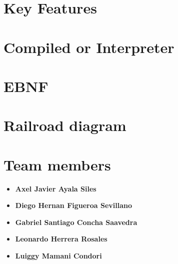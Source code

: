 \documentclass{article}
\begin{document}
\section{Key Features}
\label{sec:key-features}

\section{Compiled or Interpreter}
\label{sec:compiled-or-interpreter}

\section{EBNF}
\label{sec:bnf}

\section{Railroad diagram}
\label{sec:grail-road}

\section{Team members}
\label{sec:members}
\begin{itemize}
    \item \textbf{Axel Javier Ayala Siles}
    \item \textbf{Diego Hernan Figueroa Sevillano}
    \item \textbf{Gabriel Santiago Concha Saavedra}
    \item \textbf{Leonardo Herrera Rosales}
    \item \textbf{Luiggy Mamani Condori}
\end{itemize}
\end{document}
